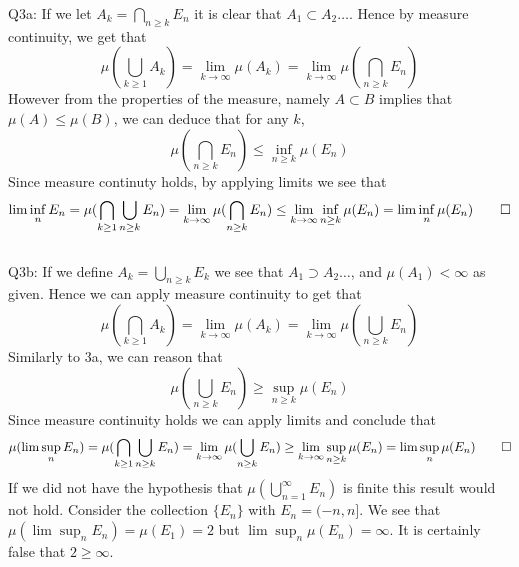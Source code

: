 \documentclass[letterpaper]{article}
\begin{document}
\noindent
Q3a: If we let $A_k = \bigcap _{n\geq k} E_n$ it is clear that $A_1 \subset A_2 \dots$. Hence by measure continuity, we get that 
$$\mu(\bigcup_{k\geq 1} A_k) = \lim_{k\to \infty} \mu(A_k) = \lim_{k \to \infty} \mu( \bigcap_{n \geq k} E_n)$$
However from the properties of the measure, namely $A \subset B$ implies that $\mu(A) \leq \mu(B)$, we can deduce that for any $k$, $$\mu(\bigcap_{n \geq k} E_n) \leq \inf_{n\geq k} \mu(E_n)$$
Since measure continuty holds, by applying limits we see that $$\lim \inf_n E_n = \mu (\bigcap_{k\geq 1} \bigcup_{n\geq k} E_n) = \lim_{k \to \infty} \mu(\bigcap_{n\geq k} E_n) \leq \lim_{k \to \infty} \inf_{n\geq k} \mu(E_n) = \lim \inf_{n} \mu(E_n) \qed$$
\newline \\ 
\noindent 
Q3b: 
If we define $A_k = \bigcup_{n\geq k}E_k$ we see that $A_1 \supset A_2 \dots$, and $\mu(A_1)< \infty$ as given. Hence we can apply measure continuity to get that 
$$\mu(\bigcap_{k \geq 1} A_k) = \lim_{k \to \infty} \mu(A_k) = \lim_{k \to \infty} \mu(\bigcup_{n\geq k}E_n)$$
Similarly to 3a, we can reason that $$\mu(\bigcup_{n\geq k} E_n) \geq \sup_{n\geq k}\mu(E_n)$$
Since measure continuity holds we can apply limits and conclude that 
$$\mu(\lim \sup_n E_n) = \mu(\bigcap_{k\geq 1} \bigcup_{n\geq k} E_n) = \lim_{k\to \infty} \mu(\bigcup_{n\geq k} E_n) \geq \lim_{k\to \infty}\sup_{n \geq k} \mu(E_n) = \lim \sup_n \mu(E_n) \qed$$
If we did not have the hypothesis that $\mu(\bigcup_{n=1}^{\infty}E_n)$ is finite this result would not hold. Consider the collection $\{E_n\}$ with $E_n = (-n, n]$. We see that $\mu(\lim \sup_n E_n) = \mu(E_1) =2$ but $\lim \sup_n \mu(E_n) = \infty$. It is certainly false that $2\geq \infty$. 
\end{document}
